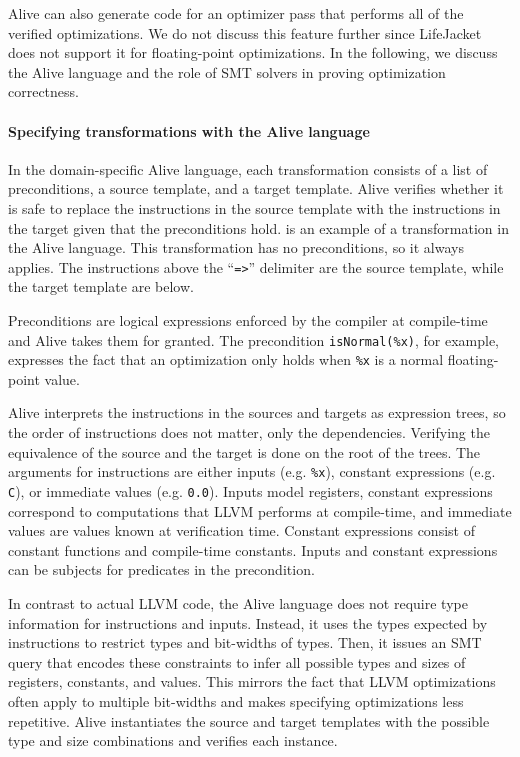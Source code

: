 \documentclass[preprint, numbers]{sigplanconf}
\newcommand{\xxx}{LifeJacket}
\begin{document}
Alive can also generate code for an optimizer pass that performs all of the
verified optimizations. We do not discuss this feature further since \xxx{}
does not support it for floating-point optimizations. In the following, we
discuss the Alive language and the role of SMT solvers in proving optimization
correctness.

\paragraph{Specifying transformations with the Alive language} In the
domain-specific Alive language, each transformation consists of a list of
preconditions, a source template, and a target template. Alive verifies whether
it is safe to replace the instructions in the source template with the
instructions in the target given that the preconditions hold. 
 is an example of a transformation in the Alive language. This
transformation has no preconditions, so it always applies. The instructions
above the ``\texttt{=>}'' delimiter are the source template, while the target
template are below.

Preconditions are logical expressions enforced by the compiler at compile-time
and Alive takes them for granted. The precondition \texttt{isNormal(\%x)}, for
example, expresses the fact that an optimization only holds when \texttt{\%x}
is a normal floating-point value.

Alive interprets the instructions in the sources and targets as expression
trees, so the order of instructions does not matter, only the dependencies.
Verifying the equivalence of the source and the target is done on the root of
the trees. The arguments for instructions are either inputs (e.g.
\texttt{\%x}), constant expressions (e.g. \texttt{C}), or immediate values
(e.g. \texttt{0.0}). Inputs model registers, constant expressions correspond to
computations that LLVM performs at compile-time, and immediate values are
values known at verification time. Constant expressions consist of constant
functions and compile-time constants. Inputs and constant expressions can be
subjects for predicates in the precondition.

In contrast to actual LLVM code, the Alive language does not require type
information for instructions and inputs. Instead, it uses the types expected by
instructions to restrict types and bit-widths of types. Then, it issues an SMT
query that encodes these constraints to infer all possible types and sizes of
registers, constants, and values. This mirrors the fact that LLVM optimizations
often apply to multiple bit-widths and makes specifying optimizations less
repetitive. Alive instantiates the source and target templates with the
possible type and size combinations and verifies each instance.
\end{document}
